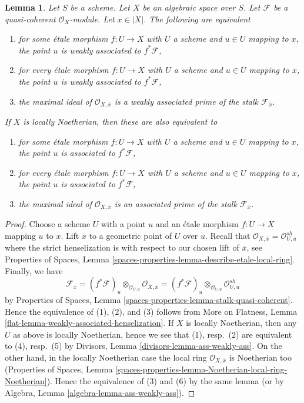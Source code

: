 \documentclass{stacks-project}
\theoremstyle{plain}
\newtheorem{lemma}[subsection]{Lemma}
\theoremstyle{definition}
\theoremstyle{remark}
\numberwithin{equation}{subsection}
\begin{document}
\begin{lemma}
\label{lemma-associated}
Let $S$ be a scheme. Let $X$ be an algebraic space over $S$.
Let $\mathcal{F}$ be a quasi-coherent $\mathcal{O}_X$-module.
Let $x \in |X|$. The following are equivalent
\begin{enumerate}
\item for some \'etale morphism $f : U \to X$ with $U$ a scheme
and $u \in U$ mapping to $x$, the point $u$ is weakly associated
to $f^*\mathcal{F}$,
\item for every \'etale morphism $f : U \to X$ with $U$ a scheme
and $u \in U$ mapping to $x$, the point $u$ is weakly associated
to $f^*\mathcal{F}$,
\item the maximal ideal of $\mathcal{O}_{X, \overline{x}}$
is a weakly associated prime of the stalk $\mathcal{F}_{\overline{x}}$.
\end{enumerate}
If $X$ is locally Noetherian, then these are also equivalent to
\begin{enumerate}
\item[(4)] for some \'etale morphism $f : U \to X$ with $U$ a scheme
and $u \in U$ mapping to $x$, the point $u$ is associated
to $f^*\mathcal{F}$,
\item[(5)] for every \'etale morphism $f : U \to X$ with $U$ a scheme
and $u \in U$ mapping to $x$, the point $u$ is associated
to $f^*\mathcal{F}$,
\item[(6)] the maximal ideal of $\mathcal{O}_{X, \overline{x}}$
is an associated prime of the stalk $\mathcal{F}_{\overline{x}}$.
\end{enumerate}
\end{lemma}

\begin{proof}
Choose a scheme $U$ with a point $u$ and an \'etale morphism
$f : U \to X$ mapping $u$ to $x$. Lift $\overline{x}$ to a geometric
point of $U$ over $u$. Recall that
$\mathcal{O}_{X, \overline{x}} = \mathcal{O}_{U, u}^{sh}$
where the strict henselization is with respect to our chosen
lift of $\overline{x}$, see
Properties of Spaces, Lemma
\ref{spaces-properties-lemma-describe-etale-local-ring}.
Finally, we have
$$
\mathcal{F}_{\overline{x}} =
(f^*\mathcal{F})_u \otimes_{\mathcal{O}_{U, u}}
\mathcal{O}_{X, \overline{x}} =
(f^*\mathcal{F})_u \otimes_{\mathcal{O}_{U, u}}
\mathcal{O}_{U, u}^{sh}
$$
by
Properties of Spaces, Lemma \ref{spaces-properties-lemma-stalk-quasi-coherent}.
Hence the equivalence of (1), (2), and (3) follows from
More on Flatness, Lemma \ref{flat-lemma-weakly-associated-henselization}.
If $X$ is locally Noetherian, then
any $U$ as above is locally Noetherian,
hence we see that (1), resp.\ (2) are equivalent to (4), resp.\ (5) by
Divisors, Lemma \ref{divisors-lemma-ass-weakly-ass}.
On the other hand, in the locally Noetherian case the
local ring $\mathcal{O}_{X, \overline{x}}$ is Noetherian too
(Properties of Spaces, Lemma
\ref{spaces-properties-lemma-Noetherian-local-ring-Noetherian}).
Hence the equivalence of (3) and (6) by the same lemma
(or by Algebra, Lemma \ref{algebra-lemma-ass-weakly-ass}).
\end{proof}
\end{document}
